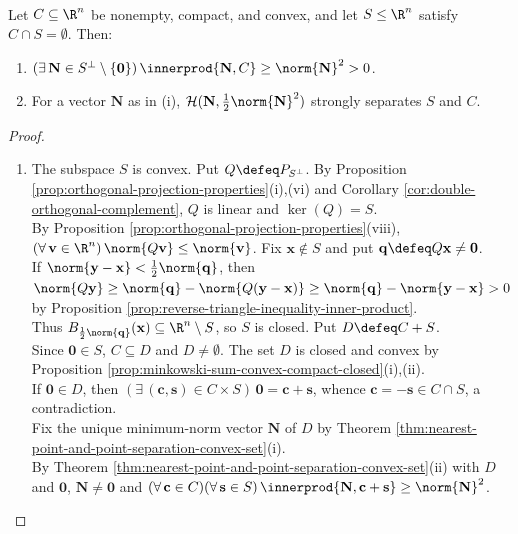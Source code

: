 \begin{theorem} \label{thm:compact-convex-set-separated-from-subspace} \\
Let $C\subseteq\R^n$ be nonempty, compact, and convex, and let $S\leq\R^n$ satisfy $C\cap S=\emptyset$. Then:
\begin{enumerate}[label=(\roman*)]
\setlength{\itemsep}{0pt}
\item $(\exists\,\mathbf{N}\in S^\perp\setminus\{\mathbf{0}\})\,\innerprod{\mathbf{N},C}\geq\norm{\mathbf{N}}^2>0$.
\item For a vector $\mathbf{N}$ as in (i), $\mathcal{H}(\mathbf{N},\frac{1}{2}\norm{\mathbf{N}}^2)$ strongly separates $S$ and $C$.
\end{enumerate}
\begin{proof}
\begin{enumerate}[label=(\roman*)]
\setlength{\itemsep}{0pt}
\item The subspace $S$ is convex. Put $Q\defeq P_{S^\perp}$. By Proposition \ref{prop:orthogonal-projection-properties}(i),(vi) and Corollary \ref{cor:double-orthogonal-complement}, $Q$ is linear and $\ker(Q)=S$.\\
By Proposition \ref{prop:orthogonal-projection-properties}(viii), $(\forall\,\mathbf{v}\in\R^n)\,\norm{Q\mathbf{v}}\leq\norm{\mathbf{v}}$. Fix $\mathbf{x}\notin S$ and put $\mathbf{q}\defeq Q\mathbf{x}\neq\mathbf{0}$.\\
If $\norm{\mathbf{y}-\mathbf{x}}<\frac{1}{2}\norm{\mathbf{q}}$, then $\norm{Q\mathbf{y}}\geq\norm{\mathbf{q}}-\norm{Q(\mathbf{y}-\mathbf{x})}\geq\norm{\mathbf{q}}-\norm{\mathbf{y}-\mathbf{x}}>0$ by Proposition \ref{prop:reverse-triangle-inequality-inner-product}.\\
Thus $B_{\frac{1}{2}\norm{\mathbf{q}}}(\mathbf{x})\subseteq\R^n\setminus S$, so $S$ is closed. Put $D\defeq C+S$.\\
Since $\mathbf{0}\in S$, $C\subseteq D$ and $D\neq\emptyset$. The set $D$ is closed and convex by Proposition \ref{prop:minkowski-sum-convex-compact-closed}(i),(ii).\\
If $\mathbf{0}\in D$, then $(\exists\,(\mathbf{c},\mathbf{s})\in C\times S)\,\mathbf{0}=\mathbf{c}+\mathbf{s}$, whence $\mathbf{c}=-\mathbf{s}\in C\cap S$, a contradiction.\\
Fix the unique minimum-norm vector $\mathbf{N}$ of $D$ by Theorem \ref{thm:nearest-point-and-point-separation-convex-set}(i).\\
By Theorem \ref{thm:nearest-point-and-point-separation-convex-set}(ii) with $D$ and $\mathbf{0}$, $\mathbf{N}\neq\mathbf{0}$ and $(\forall\,\mathbf{c}\in C)(\forall\,\mathbf{s}\in S)\,\innerprod{\mathbf{N},\mathbf{c}+\mathbf{s}}\geq\norm{\mathbf{N}}^2$.\\

\end{enumerate}
\end{proof}
\end{theorem}
